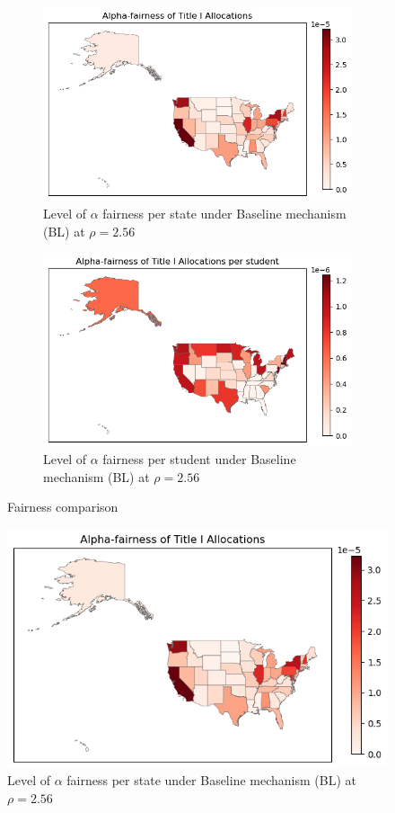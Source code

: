 \documentclass[9pt,twocolumn,twoside,lineno]{pnas-new}
\begin{document}
\begin{figure}[h]
  \centering
  \begin{subfigure}[t]{0.49\linewidth}
    \centering
    \includegraphics[width=\linewidth]{images/af_by_state.png}
    \caption{Level of $\alpha$ fairness per state under Baseline mechanism (BL) at $\rho = 2.56$}
    \label{fig:state_alpha}
  \end{subfigure}
  \hfill
  \begin{subfigure}[t]{0.49\linewidth}
    \centering
    \includegraphics[width=\linewidth]{images/af_by_student.png}
    \caption{Level of $\alpha$ fairness per student under Baseline mechanism (BL) at $\rho = 2.56$}
    \label{fig:student_alpha}
  \end{subfigure}
  \caption{Fairness comparison}
  \label{fig:fairness_comparison}
\end{figure}


\begin{figure}[h]
\centering
\includegraphics[width=0.5\linewidth]{images/af_states_map.png}
\caption{Level of  $\alpha$ fairness per state  under Baseline mechanism (BL) at $\rho = 2.56$}
\label{fig:state_alpha}
\end{figure}
\end{document}
